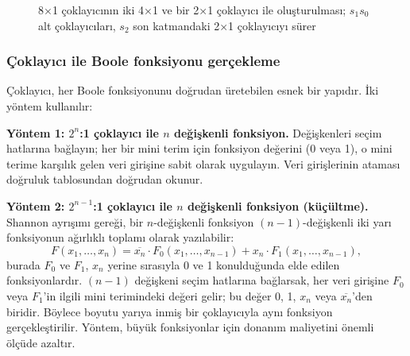 \begin{figure}[H]
\caption{8×1 çoklayıcının iki 4×1 ve bir 2×1 çoklayıcı ile oluşturulması; $s_1 s_0$ alt çoklayıcıları, $s_2$ son katmandaki 2×1 çoklayıcıyı sürer}
\label{fig:B.mux-hierarchical}
\end{figure}


\subsubsection{Çoklayıcı ile Boole fonksiyonu gerçekleme}
Çoklayıcı, her Boole fonksiyonunu doğrudan üretebilen esnek bir yapıdır. İki yöntem kullanılır:

\textbf{Yöntem 1: $2^n$:1 çoklayıcı ile $n$ değişkenli fonksiyon.}
Değişkenleri seçim hatlarına bağlayın; her bir mini terim için fonksiyon değerini (0 veya 1), o mini terime karşılık gelen veri girişine sabit olarak uygulayın. Veri girişlerinin ataması doğruluk tablosundan doğrudan okunur.

\textbf{Yöntem 2: $2^{n-1}$:1 çoklayıcı ile $n$ değişkenli fonksiyon (küçültme).}
Shannon ayrışımı gereği, bir $n$-değişkenli fonksiyon $(n-1)$-değişkenli iki yarı fonksiyonun ağırlıklı toplamı olarak yazılabilir:
\[ F(x_1,\ldots,x_n) = \overline{x_n}\cdot F_0(x_1,\ldots,x_{n-1}) + x_n \cdot F_1(x_1,\ldots,x_{n-1}), \]
burada $F_0$ ve $F_1$, $x_n$ yerine sırasıyla 0 ve 1 konulduğunda elde edilen fonksiyonlardır. $(n-1)$ değişkeni seçim hatlarına bağlarsak, her veri girişine $F_0$ veya $F_1$'in ilgili mini terimindeki değeri gelir; bu değer 0, 1, $x_n$ veya $\overline{x_n}$'den biridir. Böylece boyutu yarıya inmiş bir çoklayıcıyla aynı fonksiyon gerçekleştirilir. Yöntem, büyük fonksiyonlar için donanım maliyetini önemli ölçüde azaltır.

